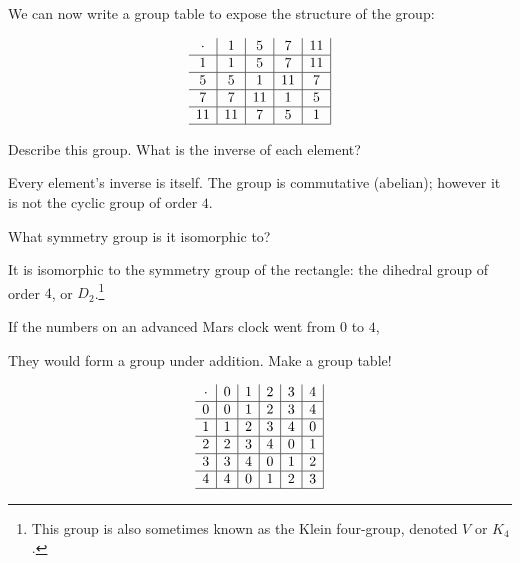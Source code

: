 \documentclass[../gatm_answers.tex]{subfiles}
\begin{document}
We can now write a group table to expose the structure of the group:

$$\begin{array}{c|c|c|c|c|}
\cdot & 1 & 5 & 7 & 11 \\ \hline
1 & 1 & 5 & 7 & 11 \\ \hline
5 & 5 & 1 & 11 & 7 \\ \hline
7 & 7 & 11 & 1 & 5 \\ \hline
11 & 11 & 7 & 5 & 1 \\ \hline
\end{array}$$

\begin{inner_problem}
\item Describe this group. What is the inverse of each element?
\end{inner_problem}

Every element's inverse is itself. The group is commutative (abelian); however it is not the cyclic group of order $4$.

\begin{inner_problem}
\item What symmetry group is it isomorphic to?
\end{inner_problem}

It is isomorphic to the symmetry group of the rectangle: the dihedral group of order $4$, or $D_2$.\footnote{This group is also sometimes known as the Klein four-group, denoted $V$ or $K_4$.}

\begin{outer_problem}
\item If the numbers on an advanced Mars clock went from $0$ to $4$,
\end{outer_problem}

\begin{inner_problem}[start=1]
\item They would form a group under addition. Make a group table!
\end{inner_problem}

$$\begin{array}{c|c|c|c|c|c|}
\cdot & 0 & 1 & 2 & 3 & 4 \\ \hline
0 & 0 & 1 & 2 & 3 & 4 \\ \hline
1 & 1 & 2 & 3 & 4 & 0 \\ \hline
2 & 2 & 3 & 4 & 0 & 1 \\ \hline
3 & 3 & 4 & 0 & 1 & 2 \\ \hline
4 & 4 & 0 & 1 & 2 & 3 \\ \hline
\end{array}$$
\end{document}
